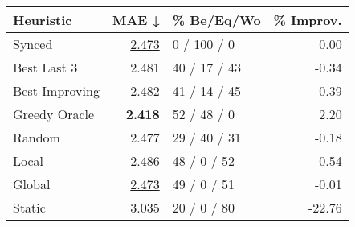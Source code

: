 \begin{tabular}{lrlr}
\toprule
\textbf{Heuristic} & \textbf{MAE ↓} & \textbf{\% Be/Eq/Wo} & \textbf{\% Improv.} \\
\midrule
            Synced &          \underline{2.473} &          0 / 100 / 0 &                0.00 \\
\midrule
       Best Last 3 &          2.481 &         40 / 17 / 43 &               -0.34 \\
    Best Improving &          2.482 &         41 / 14 / 45 &               -0.39 \\
\addlinespace
     Greedy Oracle &          \textbf{2.418} &          52 / 48 / 0 &                2.20 \\
            Random &          2.477 &         29 / 40 / 31 &               -0.18 \\
\midrule
             Local &          2.486 &          48 / 0 / 52 &               -0.54 \\
            Global &          \underline{2.473} &          49 / 0 / 51 &               -0.01 \\
\midrule
            Static &          3.035 &          20 / 0 / 80 &              -22.76 \\
\bottomrule
\end{tabular}

\label{tab:hr_iid_lr01_le2_bs2_Summary}
